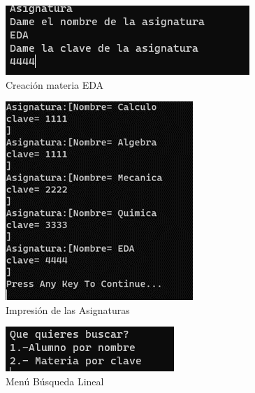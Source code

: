 \documentclass{report}
\begin{document}
\begin{figure}
    \centering
    \includegraphics[width=1\linewidth]{Imagen15.png}
    \caption{Creación materia EDA}
    
\end{figure}
\begin{figure}
    \centering
    \includegraphics[width=1\linewidth]{Imagen16.png}
    \caption{Impresión de las Asignaturas }
    
\end{figure}
\begin{figure}
    \centering
    \includegraphics[width=1\linewidth]{Imagen17.png}
    \caption{Menú Búsqueda Lineal}
    
\end{figure}
\end{document}
